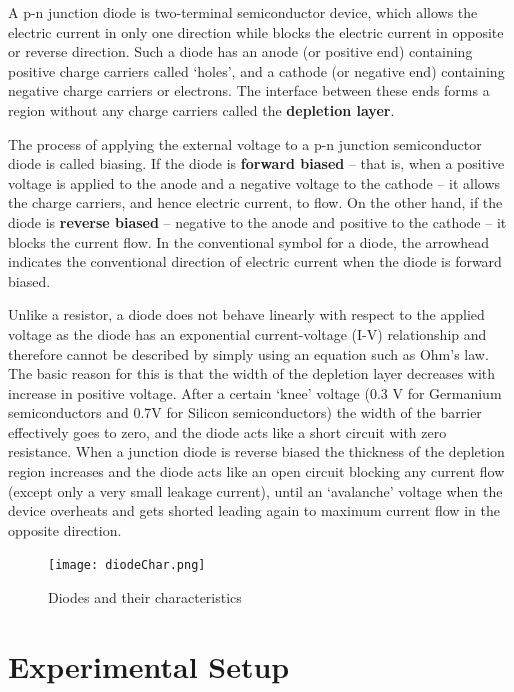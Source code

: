 A p-n junction diode is two-terminal semiconductor device, which allows the electric current in only one direction while blocks the electric current in opposite or reverse direction. Such a diode has an anode (or positive end) containing positive charge carriers called `holes', and a cathode (or negative end) containing negative charge carriers or electrons. The interface between these ends forms a region without any charge carriers called the \textbf{depletion layer}. 

The process of applying the external voltage to a p-n junction semiconductor diode is called biasing. If the diode is \textbf{forward biased} -- that is, when a positive voltage is applied to the anode and a negative voltage to the cathode -- it allows the charge carriers, and hence electric current, to flow. On the other hand, if the diode is \textbf{reverse biased} -- negative to the anode and positive to the cathode -- it blocks the current flow. In the conventional symbol for a diode, the arrowhead indicates the conventional direction of electric current when the diode is forward biased.

Unlike a resistor, a diode does not behave linearly with respect to the applied voltage as the diode has an exponential current-voltage (I-V) relationship and therefore cannot be described by simply using an equation such as Ohm’s law. The basic reason for this is that the width of the depletion layer decreases with increase in positive voltage. After a certain `knee' voltage (0.3 V for Germanium semiconductors and 0.7V for Silicon semiconductors) the width of the barrier effectively goes to zero, and the diode acts like a short circuit with zero resistance. When a junction diode is reverse biased the thickness of the depletion region increases and the diode acts like an open circuit blocking any current flow (except only a very small leakage current), until an `avalanche' voltage when the device overheats and gets shorted leading again to maximum current flow in the opposite direction.

\begin{figure}[!htb]
\centering
\texttt{[image: diodeChar.png]}
\caption{Diodes and their characteristics}
\label{fig:diodeChar}
\end{figure}



\section*{Experimental Setup}


